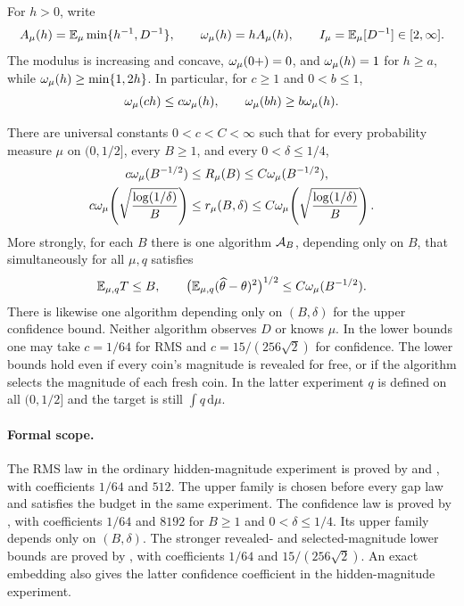 For $h>0$, write
\begin{equation}\label{eq:A-I}
 A_\mu(h)=\mathbb E_\mu\min\{h^{-1},D^{-1}\},\qquad
 \omega_\mu(h)=hA_\mu(h),\qquad I_\mu=\mathbb E_\mu[D^{-1}]\in[2,\infty].
\end{equation}
The modulus is increasing and concave, $\omega_\mu(0+)=0$, and $\omega_\mu(h)=1$ for
$h\ge a$, while $\omega_\mu(h)\ge\min\{1,2h\}$. In particular, for $c\ge1$ and $0<b\le1$,
\begin{equation}\label{eq:scaling}
 \omega_\mu(ch)\le c\omega_\mu(h),\qquad \omega_\mu(bh)\ge b\omega_\mu(h).
\end{equation}

\begin{theorem}\label{thm:main}
There are universal constants $0<c<C<\infty$ such that for every probability
measure $\mu$ on $(0,1/2]$, every $B\ge1$, and every $0<\delta\le1/4$,
\begin{align}
 c\omega_\mu(B^{-1/2})&\le R_\mu(B)\le C\omega_\mu(B^{-1/2}),\label{eq:main-rms}\\
 c\omega_\mu\!\left(\sqrt{\frac{\log(1/\delta)}{B}}\right)
 &\le r_\mu(B,\delta)
 \le C\omega_\mu\!\left(\sqrt{\frac{\log(1/\delta)}{B}}\right).
 \label{eq:main-conf}
\end{align}
More strongly, for each $B$ there is one algorithm $\mathcal A_B$, depending only
on $B$, that simultaneously for all $\mu,q$ satisfies
\begin{equation}\label{eq:blind-guarantee}
 \mathbb E_{\mu,q}T\le B,\qquad
 \bigl(\mathbb E_{\mu,q}(\widehat\theta-\theta)^2\bigr)^{1/2}
 \le C\omega_\mu(B^{-1/2}).
\end{equation}
There is likewise one algorithm depending only on $(B,\delta)$ for the
upper confidence bound. Neither algorithm observes $D$ or knows $\mu$.
In the lower bounds one may take $c=1/64$ for RMS and
$c=15/(256\sqrt2)$ for confidence.
The lower bounds hold even if every coin's magnitude is revealed for free,
or if the algorithm selects the magnitude of each fresh coin. In the latter
experiment $q$ is defined on all $(0,1/2]$ and the target is still
$\int q\,\mathrm d\mu$.
\end{theorem}

\paragraph{Formal scope.}
The RMS law in the ordinary hidden-magnitude experiment is proved by
 and
, with
coefficients $1/64$ and $512$. The upper family is chosen before every
gap law and satisfies the budget in the same experiment. The
confidence law is proved by ,
with coefficients $1/64$ and $8192$ for $B\ge1$ and $0<\delta\le1/4$.
Its upper family depends only on $(B,\delta)$. The stronger revealed- and
selected-magnitude lower bounds are proved by
, with coefficients
$1/64$ and $15/(256\sqrt2)$. An exact embedding also gives the latter
confidence coefficient in the hidden-magnitude experiment.

